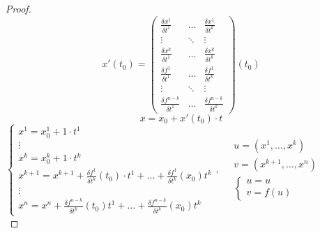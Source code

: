 \documentclass{report}
\theoremstyle{definition}
\begin{document}
\begin{proof}
  \begin{equation*}
    x'(t_0) = \left(\begin{array}{ccc}
      \frac{\delta x^1}{\delta t^1}     & \ldots & \frac{\delta x^1}{\delta t^k}     \\
      \vdots                            & \ddots & \vdots                            \\
      \frac{\delta x^k}{\delta t^1}     & \ldots & \frac{\delta x^k}{\delta t^k}     \\
      \frac{\delta f^1}{\delta t^1}     & \ldots & \frac{\delta f^1}{\delta t^k}     \\
      \vdots                            & \ddots & \vdots                            \\
      \frac{\delta f^{n-k}}{\delta t^1} & \ldots & \frac{\delta f^{n-k}}{\delta t^k}
    \end{array}\right)(t_0)
  \end{equation*}
  \begin{equation*}
    x = x_0 + x'(t_0)\cdot t
  \end{equation*}
  $\left\{\begin{array}{l}
      x^1 = x_0^1 + 1 \cdot t^1                                                                                         \\
      \vdots                                                                                                            \\
      x^k = x_0^k + 1 \cdot t^k                                                                                         \\
      x^{k+1} = x^{k+1} + \frac{\delta f^1}{\delta t^k}(t_0) \cdot t^1 + \ldots + \frac{\delta f^1}{\delta t^k}(x_0)t^k \\
      \vdots                                                                                                            \\
      x^n = x^n + \frac{\delta f^{n-k}}{\delta t^k}(t_0) t^1 + \ldots + \frac{\delta f^{n-k}}{\delta t^k}(x_0)t^k
    \end{array}\right., \quad \begin{array}{l}
      u = (x^1,\ldots,x^k)     \\
      v = (x^{k+1},\ldots,x^n) \\
      \left\{\begin{array}{l}
               u = u \\
               v = f(u)
             \end{array}\right.
    \end{array}$ \\


\end{proof}
\end{document}
